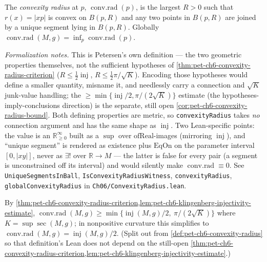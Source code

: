 \begin{definition}
  \label{def:pet-ch6-convexity-radius}
  \leanok
  The \emph{convexity radius} at $p$, $\operatorname{conv.rad}(p)$, is the largest
  $R>0$ such that $r(x)=|xp|$ is convex on $B(p,R)$ and any two points in $B(p,R)$
  are joined by a unique segment lying in $B(p,R)$. Globally
  $\operatorname{conv.rad}(M,g)=\inf_p\operatorname{conv.rad}(p)$.

  \emph{Formalization notes.} This is Petersen's own definition --- the two
  geometric properties themselves, not the sufficient hypotheses of
  \cref{thm:pet-ch6-convexity-radius-criterion} ($R\le\tfrac12\operatorname{inj}$,
  $R\le\tfrac12\pi/\sqrt K$). Encoding those hypotheses would define a smaller
  quantity, misname it, and needlessly carry a connection and $\sqrt K$
  junk-value handling; the $\ge\min\{\operatorname{inj}/2,\pi/(2\sqrt K)\}$
  estimate (the hypotheses-imply-conclusions direction) is the separate, still
  open \cref{cor:pet-ch6-convexity-radius-bound}. Both defining properties are
  metric, so \texttt{convexityRadius} takes \emph{no} connection argument and has
  the same shape as $\operatorname{inj}$. Two Lean-specific points: the value is an
  $\mathbb{R}_{\ge0}^\infty$ built as a $\sup$ over $\mathrm{ofReal}$-images
  (mirroring $\operatorname{inj}$), and ``unique segment'' is rendered as existence
  plus $\mathrm{EqOn}$ on the parameter interval $[0,|xy|]$, never as $\exists!$
  over $\mathbb{R}\to M$ --- the latter is false for every pair (a segment is
  unconstrained off its interval) and would silently make
  $\operatorname{conv.rad}\equiv0$. See \texttt{UniqueSegmentsInBall},
  \texttt{IsConvexityRadiusWitness}, \texttt{convexityRadius},
  \texttt{globalConvexityRadius} in \texttt{Ch06/ConvexityRadius.lean}.
\end{definition}

\begin{corollary}
  \label{cor:pet-ch6-convexity-radius-bound}
  \notready
  By \cref{thm:pet-ch6-convexity-radius-criterion,lem:pet-ch6-klingenberg-injectivity-estimate},
  $\operatorname{conv.rad}(M,g)\ge\min\{\operatorname{inj}(M,g)/2,\ \pi/(2\sqrt K)\}$ where
  $K=\sup\sec(M,g)$; in nonpositive curvature this simplifies to
  $\operatorname{conv.rad}(M,g)=\operatorname{inj}(M,g)/2$. (Split out from
  \cref{def:pet-ch6-convexity-radius} so that definition's Lean does not depend on
  the still-open \cref{thm:pet-ch6-convexity-radius-criterion,lem:pet-ch6-klingenberg-injectivity-estimate}.)
\end{corollary}

